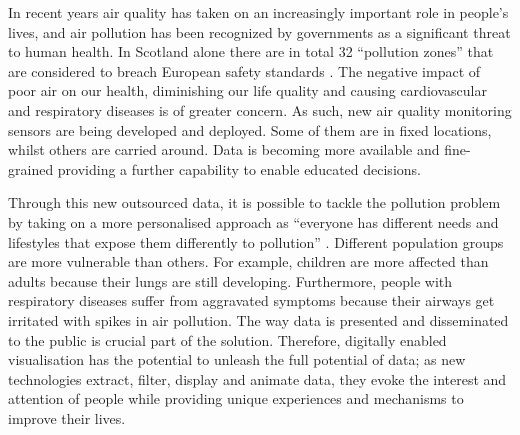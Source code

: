 In recent years air quality has taken on an increasingly important role in people’s lives, and air pollution has been recognized by governments as a significant threat to human health. In Scotland alone there are in total 32 ``pollution zones'' that are considered to breach European safety standards \cite{Foe-scotland.org.uk} \cite{OKScotland2015}. The negative impact of poor air on our health, diminishing our life quality and causing cardiovascular and respiratory diseases is of greater concern. As such, new air quality monitoring sensors are being developed and deployed. Some of them are in fixed locations, whilst others are carried around. Data is becoming more available and fine-grained providing a further capability to enable educated decisions.

Through this new outsourced data, it is possible to tackle the pollution problem by taking on a  more personalised approach as ``everyone has different needs and lifestyles that expose them differently to pollution'' \cite{Vazquez2016}. Different population groups are more vulnerable than others. For example, children are more affected than adults because their lungs are still developing. Furthermore, people with respiratory diseases suffer from aggravated symptoms because their airways get irritated with spikes in air pollution. The way data is presented and disseminated to the public is crucial part of the solution. Therefore, digitally enabled visualisation has the potential to unleash the full potential of data; as new technologies extract, filter, display and animate data, they evoke the interest and attention of people while providing unique experiences and mechanisms to improve their lives.

\iffalse
The effects of air pollution on human health are still complex to understand and there is much research ongoing on the combination short and long term effects upon a person's health. 
\fi